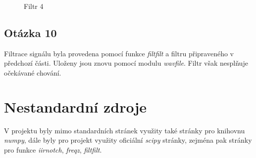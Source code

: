\documentclass[a4paper,12pt]{article}
\begin{document}
\begin{figure}[H]
\centering
\begin{minipage}{0.48\textwidth}
\end{minipage}
\hfill 
\begin{minipage}{0.48\textwidth}
\end{minipage}
\caption{Filtr 4}
\end{figure}

\newpage
\subsection{Otázka 10}
Filtrace signálu byla provedena pomocí funkce \emph{filtfilt} a filtru připraveného v předchozí části. Uloženy jsou znovu pomocí modulu \emph{wavfile}. Filtr však nesplňuje očekávané chování.

\section{Nestandardní zdroje}
V projektu byly mimo standardních stránek využity také stránky pro knihovnu \emph{numpy}, dále byly pro projekt využity oficiální \emph{scipy} stránky, zejména pak stránky pro funkce \emph{iirnotch}, \emph{freqz}, \emph{filtfilt}.
\end{document}
